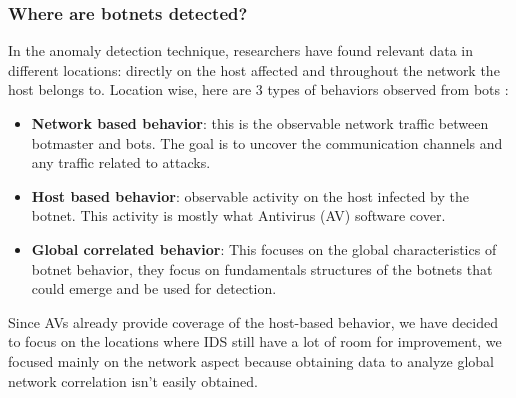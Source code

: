 \subsubsection{Where are botnets detected?} In the anomaly detection technique, researchers have found relevant data in different locations: directly on the host affected and throughout the network the host belongs to. Location wise, here are 3 types of behaviors observed from bots\cite{bot-threat1} :
\begin{itemize}
\item \textbf{Network based behavior}: this is the observable network traffic between botmaster and bots. The goal is to uncover the communication channels and any traffic related to attacks. 
\item \textbf{Host based behavior}: observable activity on the host infected by the botnet. This activity is mostly what Antivirus (AV) software cover.
\item \textbf{Global correlated behavior}: This focuses on the global characteristics of botnet behavior, they focus on fundamentals structures of the botnets that could emerge and be used for detection.
\end{itemize}
Since AVs already provide coverage of the host-based behavior, we have decided to focus on the locations where IDS still have a lot of room for improvement, we focused mainly on the network aspect because obtaining data to analyze global network correlation isn't easily obtained.

